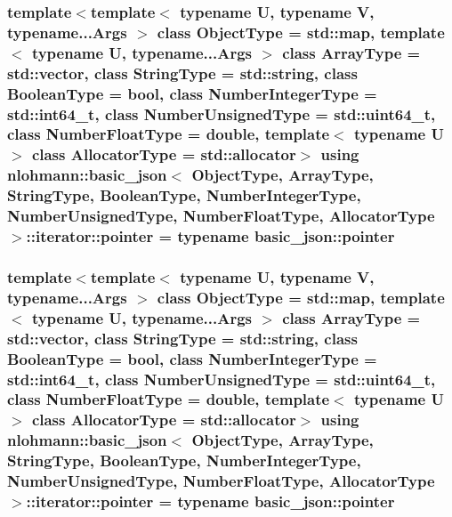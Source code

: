 \hypertarget{classnlohmann_1_1basic__json_1_1iterator_a3aae1df93a78b201d98e178c1c7d02a7}{
\subsubsection[{pointer}]{\setlength{\rightskip}{0pt plus 5cm}template$<$template$<$ typename U, typename V, typename...\-Args $>$ class Object\-Type = std\-::map, template$<$ typename U, typename...\-Args $>$ class Array\-Type = std\-::vector, class String\-Type  = std\-::string, class Boolean\-Type  = bool, class Number\-Integer\-Type  = std\-::int64\-\_\-t, class Number\-Unsigned\-Type  = std\-::uint64\-\_\-t, class Number\-Float\-Type  = double, template$<$ typename U $>$ class Allocator\-Type = std\-::allocator$>$ using {\bf nlohmann\-::basic\-\_\-json}$<$ Object\-Type, Array\-Type, String\-Type, Boolean\-Type, Number\-Integer\-Type, Number\-Unsigned\-Type, Number\-Float\-Type, Allocator\-Type $>$\-::{\bf iterator\-::pointer} =  typename {\bf basic\-\_\-json\-::pointer}}}\label{classnlohmann_1_1basic__json_1_1iterator_a3aae1df93a78b201d98e178c1c7d02a7}
\hypertarget{classnlohmann_1_1basic__json_1_1iterator_a3aae1df93a78b201d98e178c1c7d02a7}{
\subsubsection[{pointer}]{\setlength{\rightskip}{0pt plus 5cm}template$<$template$<$ typename U, typename V, typename...\-Args $>$ class Object\-Type = std\-::map, template$<$ typename U, typename...\-Args $>$ class Array\-Type = std\-::vector, class String\-Type  = std\-::string, class Boolean\-Type  = bool, class Number\-Integer\-Type  = std\-::int64\-\_\-t, class Number\-Unsigned\-Type  = std\-::uint64\-\_\-t, class Number\-Float\-Type  = double, template$<$ typename U $>$ class Allocator\-Type = std\-::allocator$>$ using {\bf nlohmann\-::basic\-\_\-json}$<$ Object\-Type, Array\-Type, String\-Type, Boolean\-Type, Number\-Integer\-Type, Number\-Unsigned\-Type, Number\-Float\-Type, Allocator\-Type $>$\-::{\bf iterator\-::pointer} =  typename {\bf basic\-\_\-json\-::pointer}}}\label{classnlohmann_1_1basic__json_1_1iterator_a3aae1df93a78b201d98e178c1c7d02a7}
